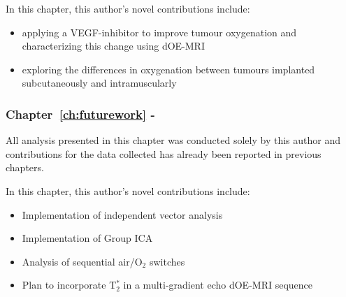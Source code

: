 In this chapter, this author's novel contributions include:

\begin{itemize}
\item applying a VEGF-inhibitor to improve tumour oxygenation and characterizing this change using dOE-MRI
\item exploring the differences in oxygenation between tumours implanted subcutaneously and intramuscularly
\end{itemize}

\subsubsection{Chapter~\ref{ch:futurework} - }

All analysis presented in this chapter was conducted solely by this author and contributions for the data collected has already been reported in previous chapters.

In this chapter, this author's novel contributions include:

\begin{itemize}
\item Implementation of independent vector analysis
\item Implementation of Group ICA
\item Analysis of sequential air/O$_2$ switches
\item Plan to incorporate T$_2^*$ in a multi-gradient echo \acs{dOE-MRI} sequence
\end{itemize}

